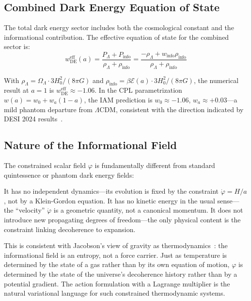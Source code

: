 \documentclass[aps,prd,twocolumn,superscriptaddress,nofootinbib]{revtex4-2}
\begin{document}
\subsection{Combined Dark Energy Equation of State}

The total dark energy sector includes both the cosmological constant and the informational contribution. The effective equation of state for the combined sector is:
\begin{equation}
w_\text{DE}^\text{eff}(a) = \frac{P_\Lambda + P_\text{info}}{\rho_\Lambda + \rho_\text{info}} = \frac{-\rho_\Lambda + w_\text{info}\rho_\text{info}}{\rho_\Lambda + \rho_\text{info}}
\end{equation}

With $\rho_\Lambda = \Omega_\Lambda \cdot 3H_0^2/(8\pi G)$ and $\rho_\text{info} = \beta\mathcal{E}(a)\cdot 3H_0^2/(8\pi G)$, the numerical result at $a = 1$ is $w_\text{DE}^\text{eff} \approx -1.06$. In the CPL parametrization $w(a) = w_0 + w_a(1-a)$, the IAM prediction is $w_0 \approx -1.06$, $w_a \approx +0.03$---a mild phantom departure from $\Lambda$CDM, consistent with the direction indicated by DESI 2024 results~\cite{DESI2024}.

\subsection{Nature of the Informational Field}

The constrained scalar field $\varphi$ is fundamentally different from standard quintessence or phantom dark energy fields:

It has no independent dynamics---its evolution is fixed by the constraint $\dot{\varphi} = H/a$, not by a Klein-Gordon equation. It has no kinetic energy in the usual sense---the ``velocity'' $\dot{\varphi}$ is a geometric quantity, not a canonical momentum. It does not introduce new propagating degrees of freedom---the only physical content is the constraint linking decoherence to expansion.

This is consistent with Jacobson's view of gravity as thermodynamics~\cite{Jacobson1995}: the informational field is an entropy, not a force carrier. Just as temperature is determined by the state of a gas rather than by its own equation of motion, $\varphi$ is determined by the state of the universe's decoherence history rather than by a potential gradient. The action formulation with a Lagrange multiplier is the natural variational language for such constrained thermodynamic systems.
\end{document}
